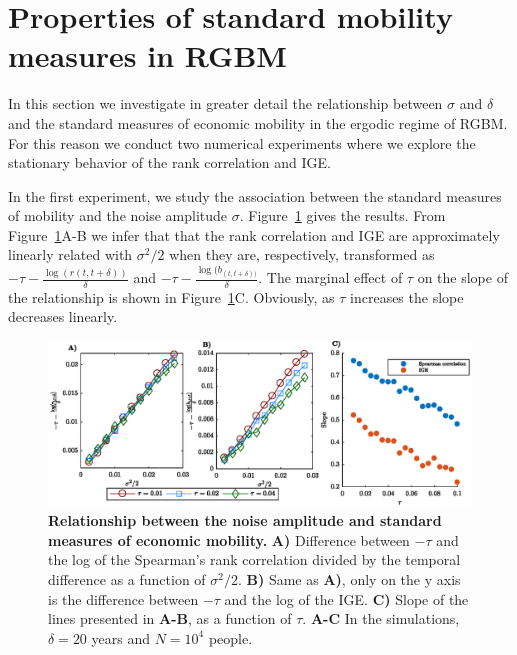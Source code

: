 \documentclass[11pt]{article}
\newcommand{\Fref}[1]{Figure~\ref{fig:#1}}
\numberwithin{equation}{section}
\begin{document}
\section{Properties of standard mobility measures in RGBM}\label{sec:properties-standard-mobility-measures}

In this section we investigate in greater detail the relationship between $\sigma$ and $\delta$ and the standard measures of economic mobility in the ergodic regime of RGBM. For this reason we conduct two numerical experiments where we explore the stationary behavior of the rank correlation and IGE. 

In the first experiment, we study the association between the standard measures of mobility and the noise amplitude $\sigma$. \Fref{rgbm-standard-measures-sigma} gives the results. From \Fref{rgbm-standard-measures-sigma}A-B we infer that that the rank correlation and IGE are approximately linearly related with $\sigma^2/2$ when they are, respectively, transformed as $-\tau - \frac{\log(r(t,t+\delta))}{\delta}$ and $-\tau - \frac{\log(b_{(t,t+\delta))}}{\delta}$. The marginal effect of $\tau$ on the slope of the relationship is shown in \Fref{rgbm-standard-measures-sigma}C. Obviously, as $\tau$ increases the slope decreases linearly.

\begin{figure}[!htb]
\centering
\includegraphics[width=1.0\textwidth]{figs/fig_rgbm_sigma_relationship.eps}
\caption{\textbf{Relationship between the noise amplitude and standard measures of economic mobility.} \textbf{A)} Difference between $-\tau$ and the log of the Spearman's rank correlation divided by the temporal difference as a function of $\sigma^2/2$. \textbf{B)} Same as \textbf{A)}, only on the y axis is the difference between $-\tau$ and the log of the IGE. \textbf{C)} Slope of the lines presented in \textbf{A-B}, as a function of $\tau$. 
\textbf{A-C} In the simulations, $\delta = 20$ years and $N = 10^4$ people.
\label{fig:rgbm-standard-measures-sigma}}
\end{figure}
\FloatBarrier
\end{document}
